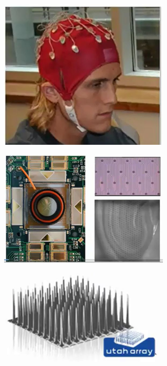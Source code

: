 \documentclass[]{article}
\begin{document}
\begin{figure}[H]
\begin{subfigure}[b]{0.3\textwidth}
	\end{subfigure}
	\begin{subfigure}[b]{0.3\textwidth}
		\caption{}\label{fig:rb3}
		\includegraphics[width=0.9\textwidth]{EEG}
	\end{subfigure}
	\begin{subfigure}[b]{0.3\textwidth}
		\caption{}\label{fig:rb4}
		\includegraphics[width=0.9\textwidth]{electrode-arrays}
	\end{subfigure}
	\begin{subfigure}[b]{0.3\textwidth}
		\caption{}\label{fig:rb5}
		\includegraphics[width=0.9\textwidth]{electrode-arrays2}

\end{subfigure}
\end{figure}
\end{document}
